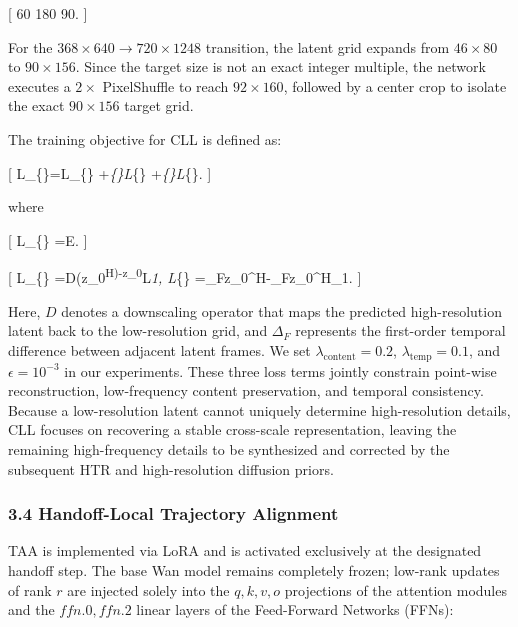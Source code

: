 {[} 60  180  90. {]}

For the \(368\times640 \rightarrow 720\times1248\) transition, the latent grid expands from \(46\times80\) to \(90\times156\). Since the target size is not an exact integer multiple, the network executes a \(2\times\) PixelShuffle to reach \(92\times160\), followed by a center crop to isolate the exact \(90\times156\) target grid.

The training objective for CLL is defined as:

{[} \mathcal L\_\{\}=\mathcal L\_\{\} +\lambda\emph{\{\}\mathcal L}\{\} +\lambda\emph{\{\}\mathcal L}\{\}. {]}

where

{[} \mathcal L\_\{\} =\mathbb E. {]}

{[} \mathcal L\_\{\} =\lVert D(\widehat z\_0\textsuperscript{H)-z\_0}L\rVert\emph{1, \qquad \mathcal L}\{\} =\lVert\Delta\_F\widehat z\_0\^{}H-\Delta\_Fz\_0\^{}H\rVert\_1. {]}

Here, \(D\) denotes a downscaling operator that maps the predicted high-resolution latent back to the low-resolution grid, and \(\Delta_F\) represents the first-order temporal difference between adjacent latent frames. We set \(\lambda_{\mathrm{content}}=0.2\), \(\lambda_{\mathrm{temp}}=0.1\), and \(\epsilon=10^{-3}\) in our experiments. These three loss terms jointly constrain point-wise reconstruction, low-frequency content preservation, and temporal consistency. Because a low-resolution latent cannot uniquely determine high-resolution details, CLL focuses on recovering a stable cross-scale representation, leaving the remaining high-frequency details to be synthesized and corrected by the subsequent HTR and high-resolution diffusion priors.

\hypertarget{handoff-local-trajectory-alignment}{%
\subsubsection{3.4 Handoff-Local Trajectory Alignment}\label{handoff-local-trajectory-alignment}}

TAA is implemented via LoRA and is activated exclusively at the designated handoff step. The base Wan model remains completely frozen; low-rank updates of rank \(r\) are injected solely into the \(q, k, v, o\) projections of the attention modules and the \(ffn.0, ffn.2\) linear layers of the Feed-Forward Networks (FFNs):

